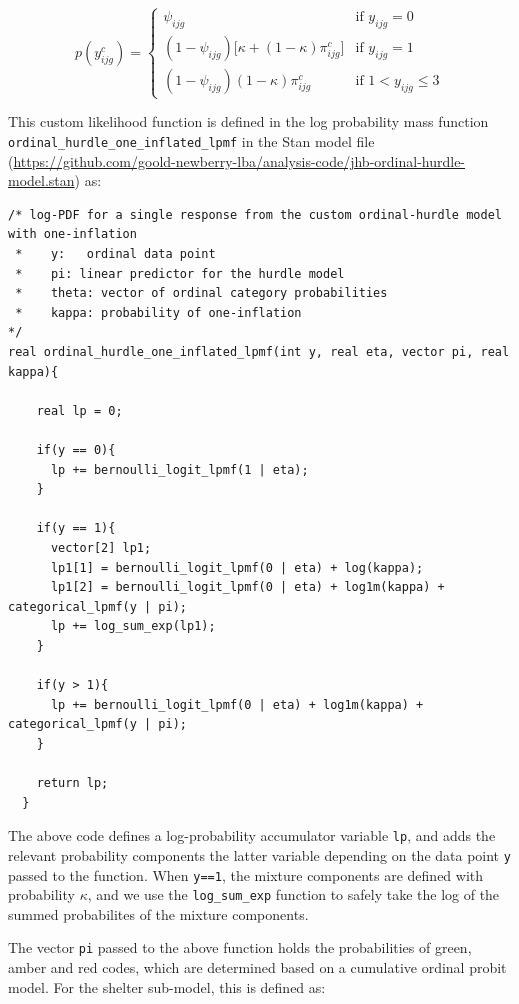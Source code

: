 \documentclass[12pt]{article}
\begin{document}
\begin{equation}
  p(y_{ijg}^{c}) =
  \begin{cases}
      \psi_{ijg} & \text{if } y_{ijg} = 0 \\
      (1-\psi_{ijg})\big[\kappa + (1-\kappa)\pi_{ijg}^c\big]
      & \text{if } y_{ijg} = 1 \\
      (1-\psi_{ijg})(1-\kappa)\pi_{ijg}^c
      & \text{if } 1 < y_{ijg} \leq 3
  \end{cases}
  \label{eq_mixture}
\end{equation}

This custom likelihood function is defined in the log probability mass function \\\texttt{ordinal\_hurdle\_one\_inflated\_lpmf} in the Stan model file (\href{https://github.com/goold-newberry-lba/analysis-code/jhb-ordinal-hurdle-model.stan}{https://github.com/goold-newberry-lba/analysis-code/jhb-ordinal-hurdle-model.stan}) as:

\begin{lstlisting}
/* log-PDF for a single response from the custom ordinal-hurdle model with one-inflation
 *    y:   ordinal data point
 *    pi: linear predictor for the hurdle model
 *    theta: vector of ordinal category probabilities
 *    kappa: probability of one-inflation
*/
real ordinal_hurdle_one_inflated_lpmf(int y, real eta, vector pi, real kappa){

    real lp = 0;

    if(y == 0){
      lp += bernoulli_logit_lpmf(1 | eta);
    }

    if(y == 1){
      vector[2] lp1;
      lp1[1] = bernoulli_logit_lpmf(0 | eta) + log(kappa);
      lp1[2] = bernoulli_logit_lpmf(0 | eta) + log1m(kappa) + categorical_lpmf(y | pi);
      lp += log_sum_exp(lp1);
    }

    if(y > 1){
      lp += bernoulli_logit_lpmf(0 | eta) + log1m(kappa) + categorical_lpmf(y | pi);
    }

    return lp;
  }
\end{lstlisting}
%
The above code defines a log-probability accumulator variable \texttt{lp}, and adds the relevant probability components the latter variable depending on the data point \texttt{y} passed to the function. When \texttt{y==1}, the mixture components are defined with probability $\kappa$, and we use the \texttt{log\_sum\_exp} function to safely take the log of the summed probabilites of the mixture components.

The vector \texttt{pi} passed to the above function holds the probabilities of green, amber and red codes, which are determined based on a cumulative ordinal probit model. For the shelter sub-model, this is defined as:
\end{document}

